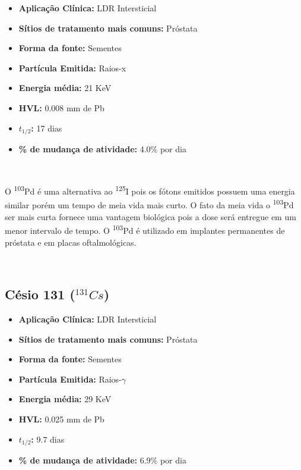 \documentclass[11pt,a4paper]{article}
\begin{document}
			\begin{itemize}
				\item \textbf{Aplicação Clínica:} LDR Intersticial
				\item \textbf{Sítios de tratamento mais comuns:} Próstata
				\item \textbf{Forma da fonte:} Sementes
				\item \textbf{Partícula Emitida:} Raios-x
				\item \textbf{Energia média: } 21 KeV
				\item \textbf{HVL:} 0.008 mm de Pb
				\item \textbf{$t_{1/2}$:} 17 dias
				\item \textbf{\% de mudança de atividade: } 4.0\% por dia
			\end{itemize}

			\

			O \textsuperscript{103}Pd é uma alternativa ao \textsuperscript{125}I pois os fótons emitidos possuem uma energia similar porém um tempo de meia vida mais curto. O fato da meia vida o \textsuperscript{103}Pd ser mais curta fornece uma vantagem biológica pois a dose será entregue em um menor intervalo de tempo. O \textsuperscript{103}Pd é utilizado em implantes permanentes de próstata e em placas oftalmológicas.

			\

		
		\subsection{Césio 131 \textbf{\textcolor{CarnationPink}{(${}^{131}Cs$)}}}

			\begin{itemize}
				\item \textbf{Aplicação Clínica:} LDR Intersticial
				\item \textbf{Sítios de tratamento mais comuns:} Próstata
				\item \textbf{Forma da fonte:} Sementes
				\item \textbf{Partícula Emitida:} Raios-$\gamma$
				\item \textbf{Energia média: } 29 KeV
				\item \textbf{HVL:} 0.025 mm de Pb
				\item \textbf{$t_{1/2}$:} 9.7 dias
				\item \textbf{\% de mudança de atividade: } 6.9\% por dia
			\end{itemize}

			\
\end{document}
